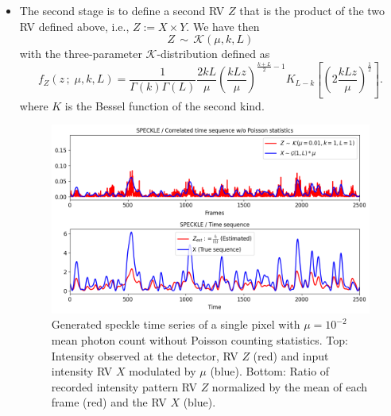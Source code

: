\documentclass[11pt]{article}
\theoremstyle{definition}
\begin{document}
\begin{itemize}
\item The second stage is to define a second RV $Z$ that is the product of the two RV defined above, i.e., $Z:=X\times Y$. We have then
%
\begin{equation}
Z  \, \sim \, \mathcal{K}(\mu, k, L) 
\label{PDF_Z|Y}
\end{equation}
%
with the three-parameter $\mathcal{K}$-distribution 
defined as 
%
\begin{equation}
f_Z(z \,;\; \mu, k, L) = \frac{1}{\Gamma(k)\Gamma(L)}\frac{2kL}{\mu}\left(\frac{kLz}{\mu} \right)^{\frac{k+L}{2}-1} K_{L-k} \left[ \left( 2\frac{kLz}{\mu}\right)^{\frac{1}{2}}\right] .
\label{PDF_K}
\end{equation}
% 
where $K$ is the Bessel function of the second kind.
\begin{figure}[h!]
    \centering
    \includegraphics[width=120mm]{figures/speckl_noPoi_newlegend.png}
    \caption{Generated speckle time series of a single pixel with \(\mu = 10^{-2}\) mean photon count without Poisson counting statistics. Top: Intensity observed at the detector, RV \(Z\) (red) and input intensity RV \(X\) modulated by \(\mu\) (blue). Bottom: Ratio of recorded intensity pattern RV \(Z\) normalized by the mean of each frame (red) and the RV \(X\) (blue).}
    \label{fig:speckle_noPoi}
\end{figure}


\end{itemize}
\end{document}
